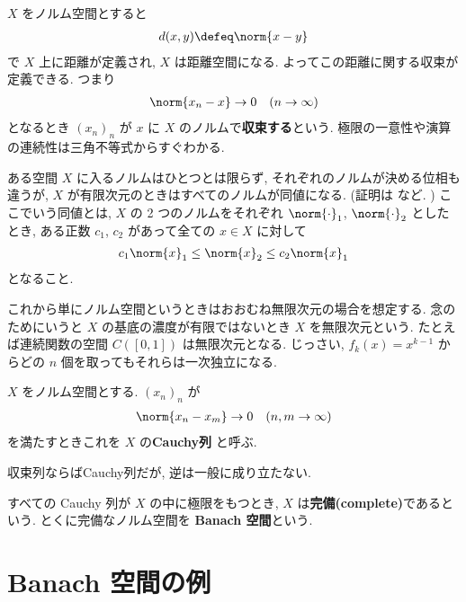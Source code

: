 \documentclass[openany, a4paper, oneside]{jsbook}
\begin{document}
$X$ をノルム空間とすると
\begin{align}
 d(x, y)
 \defeq
 \norm{x - y}
\end{align}
で $X$ 上に距離が定義され, $X$ は距離空間になる.
よってこの距離に関する収束が定義できる.
つまり
\begin{align}
 \norm{x_n - x} \to 0 \quad (n \to \infty)
\end{align}
となるとき $(x_n)_n$ が $x$ に $X$ のノルムで\textbf{収束する}という.
極限の一意性や演算の連続性は三角不等式からすぐわかる.

ある空間 $X$ に入るノルムはひとつとは限らず, それぞれのノルムが決める位相も違うが,
$X$ が有限次元のときはすべてのノルムが同値になる.
(証明は \cite{ShigetoshiKuroda1} など. )
ここでいう同値とは, $X$ の 2 つのノルムをそれぞれ $\norm{\cdot}_1$, $\norm{\cdot}_2$ としたとき,
ある正数 $c_1$, $c_2$ があって全ての $x \in X$ に対して
\begin{align}
 c_1 \norm{x}_1
 \leq
 \norm{x}_2
 \leq
 c_2 \norm{x}_1
\end{align}
となること.

これから単にノルム空間というときはおおむね無限次元の場合を想定する.
念のためにいうと $X$ の基底の濃度が有限ではないとき $X$ を無限次元という.
たとえば連続関数の空間 $C([0, 1])$ は無限次元となる.
じっさい, $f_k(x) = x^{k-1}$ からどの $n$ 個を取ってもそれらは一次独立になる.

\begin{defn}[Cauchy 列]
 $X$ をノルム空間とする.
 $(x_n)_n$ が
 \begin{align}
  \norm{x_n - x_m} \to 0 \quad (n, m \to \infty)
 \end{align}
 を満たすときこれを $X$ の\textbf{Cauchy列} と呼ぶ.
\end{defn}
収束列ならばCauchy列だが, 逆は一般に成り立たない.

\begin{defn}[Banach 空間]
すべての Cauchy 列が $X$ の中に極限をもつとき, $X$ は\textbf{完備(complete)}であるという.
とくに完備なノルム空間を \textbf{Banach 空間}という.
\end{defn}
\section{Banach 空間の例}
\end{document}

